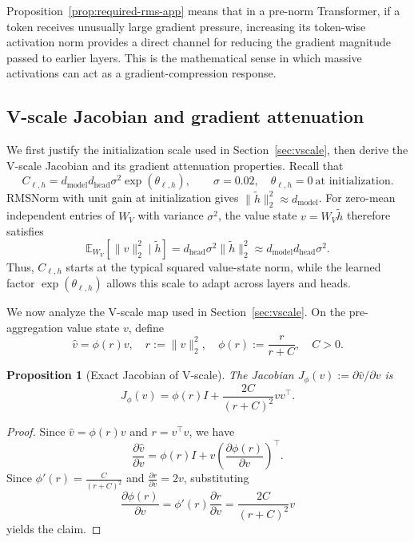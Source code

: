 \documentclass{article}
\theoremstyle{plain}
\newtheorem{proposition}{Proposition}
\theoremstyle{definition}
\theoremstyle{remark}
\begin{document}
Proposition~\ref{prop:required-rms-app} means that in a pre-norm Transformer, if a token receives unusually large gradient pressure, increasing its token-wise activation norm provides a direct channel for reducing the gradient magnitude passed to earlier layers. This is the mathematical sense in which massive activations can act as a gradient-compression response.

\subsection{V-scale Jacobian and gradient attenuation}\label{app:theory:vscale}

We first justify the initialization scale used in Section~\ref{sec:vscale}, then derive the V-scale Jacobian and its gradient attenuation properties. Recall that
\[
    C_{\ell,h}=d_{\mathrm{model}}d_{\mathrm{head}}\sigma^2\exp(\theta_{\ell,h}),
    \qquad \sigma=0.02, \quad \theta_{\ell,h}=0\ \text{at initialization}.
\]
RMSNorm with unit gain at initialization gives $\|\widetilde h\|_2^2\approx d_{\mathrm{model}}$. For zero-mean independent entries of $W_V$ with variance $\sigma^2$, the value state $v=W_V\widetilde h$ therefore satisfies
\[
    \mathbb{E}_{W_V}\!\left[\|v\|_2^2\mid\widetilde h\right]
    =d_{\mathrm{head}}\sigma^2\|\widetilde h\|_2^2
    \approx d_{\mathrm{model}}d_{\mathrm{head}}\sigma^2.
\]
Thus, $C_{\ell,h}$ starts at the typical squared value-state norm, while the learned factor $\exp(\theta_{\ell,h})$ allows this scale to adapt across layers and heads.

We now analyze the V-scale map used in Section~\ref{sec:vscale}. On the pre-aggregation value state $v$, define
\[
    \hat{v} = \phi(r) v,
    \quad
    r := \|v\|_2^2,
    \quad
    \phi(r) := \frac{r}{r+C},
    \quad
    C>0.
\]

\begin{proposition}[Exact Jacobian of V-scale]\label{prop:vscale-jac-app}
The Jacobian $J_\phi(v) := \partial \hat{v} / \partial v$ is
\begin{equation}\label{eq:vscale_jac}
    J_\phi(v) = \phi(r) I + \frac{2C}{(r+C)^2} vv^\top.
\end{equation}
\end{proposition}

\begin{proof}
Since $\hat{v} = \phi(r)v$ and $r = v^\top v$, we have
\[
    \frac{\partial \hat{v}}{\partial v}
    = \phi(r)I + v\left(\frac{\partial \phi(r)}{\partial v}\right)^\top.
\]
Since $\phi'(r) = \frac{C}{(r+C)^2}$ and $\frac{\partial r}{\partial v} = 2v$, 
substituting
\[
    \frac{\partial \phi(r)}{\partial v} = \phi'(r)\frac{\partial r}{\partial v} = \frac{2C}{(r+C)^2}v
\]
yields the claim.
\end{proof}
\end{document}
